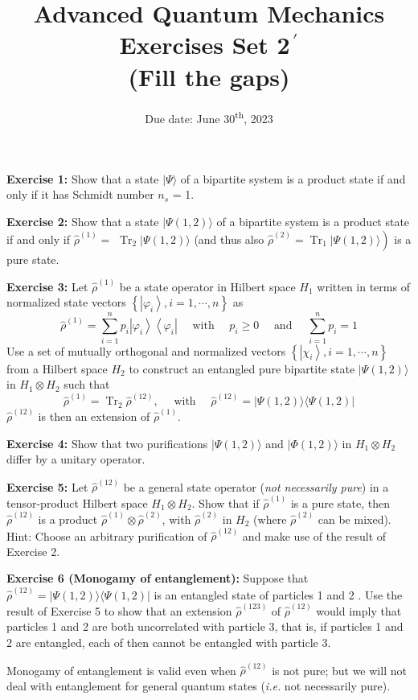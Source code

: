 \documentclass[12pt]{article}
\title{Advanced Quantum Mechanics\\Exercises Set 2$^{\,\prime}$\\(Fill the gaps)\vspace{-0.5em}}
\date{Due date: June 30\textsuperscript{th}, 2023}
\newcommand{\be}{\begin{equation}}
\newcommand{\ee}{\end{equation}}
\begin{document}
\maketitle


\textbf{Exercise 1:} Show that a state \(|\Psi\rangle\) of a bipartite system is a product state if and only if it has Schmidt number $n_s$ =  1.


\textbf{Exercise 2:} Show that a state \(|\Psi(1,2)\rangle\) of a bipartite system is a product state if and only if \(\hat{\rho}^{(1)}=\)
\(\operatorname{Tr}_{2}|\Psi(1,2)\rangle\) (and thus also \(\left.\hat{\rho}^{(2)}=\operatorname{Tr}_{1}|\Psi(1,2)\rangle\right)\) is a pure state.


\textbf{Exercise 3:} Let \(\hat{\rho}^{(1)}\) be a state operator in Hilbert space \({H}_{1}\) written in terms of normalized state vectors
\(\left\{\left|\varphi_{i}\right\rangle, i=1, \cdots, n\right\}\) as
\be
\hat{\rho}^{(1)}=\sum_{i=1}^{n} p_{i}\left|\varphi_{i}\right\rangle\left\langle\varphi_{i}\right| \quad \text{ with }\quad p_{i} \geq 0 \quad \text{ and } \quad \sum_{i=1}^{n} p_{i}=1
\ee
Use a set of mutually orthogonal and normalized vectors \(\left\{\left|\chi_{i}\right\rangle, i=1, \cdots, n\right\}\) from a Hilbert space
\({H}_{2}\) to construct an entangled pure bipartite state \(|\Psi(1,2)\rangle\) in \({H}_{1} \otimes {H}_{2}\) such that
\be
\hat{\rho}^{(1)}=\operatorname{Tr}_{2} \hat{\rho}^{(12)}, \quad \text { with } \quad \hat{\rho}^{(12)}=|\Psi(1,2)\rangle\langle\Psi(1,2)|
\ee
\(\hat{\rho}^{(12)}\) is then an extension of \(\hat{\rho}^{(1)}\).


\textbf{Exercise 4:} Show that two purifications \(|\Psi(1,2)\rangle\) and \(|\Phi(1,2)\rangle\) in \({H}_{1} \otimes {H}_{2}\) differ by a unitary operator.


\textbf{Exercise 5:} Let \(\hat{\rho}^{(12)}\) be a general state operator (\emph{not necessarily pure}) in a tensor-product Hilbert space
\({H}_{1} \otimes {H}_{2}\). Show that if \(\hat{\rho}^{(1)}\) is a pure state, then \(\hat{\rho}^{(12)}\) is a product \(\hat{\rho}^{(1)} \otimes \hat{\rho}^{(2)}\), with \(\hat{\rho}^{(2)}\) in \({H}_{2}\)
(where \(\hat{\rho}^{(2)}\) can be mixed). Hint: Choose an arbitrary purification of \(\hat{\rho}^{(12)}\) and make use of
the result of Exercise 2.


\textbf{Exercise 6 (Monogamy of entanglement):} 
Suppose that \(\hat{\rho}^{(12)}=|\Psi(1,2)\rangle\langle\Psi(1,2)|\) is an entangled state of
particles 1 and 2 . Use the result of Exercise 5 to show that an extension \(\hat{\rho}^{(123)}\) of \(\hat{\rho}^{(12)}\) would imply
that particles 1 and 2 are both uncorrelated with particle 3, that is, if particles 1 and 2 are
entangled, each of then cannot be entangled with particle 3.

Monogamy of entanglement is valid even when \(\hat{\rho}^{(12)}\) is not pure; but we will not deal with
entanglement for general quantum states (\textit{i.e.} not necessarily pure).
\end{document}
